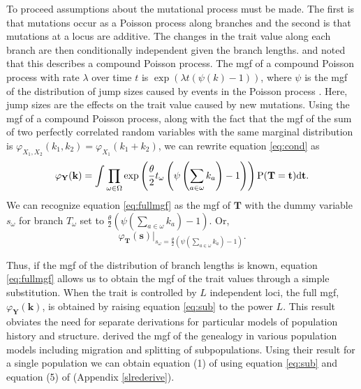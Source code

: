 To proceed assumptions about the mutational process must be made. The first is
that mutations occur as a Poisson process along branches and the second is that
mutations at a locus are additive. The changes in the trait value along each
branch are then conditionally independent given the branch
lengths. \citet{Khaitovich2005} and \citet{Schraiber2015} noted that this
describes a compound Poisson process. The mgf of a compound Poisson process with
rate $\lambda$ over time $t$ is $\exp(\lambda t (\psi(k)-1))$, where $\psi$ is
the mgf of the distribution of jump sizes caused by events in the Poisson
process \citep{kingman-poisson-processes}. Here, jump sizes are the effects on
the trait value caused by new mutations. Using the mgf of a compound Poisson
process, along with the fact that the mgf of the sum of two perfectly correlated
random variables with the same marginal distribution is
$\varphi_{X_1,X_2}(k_1,k_2)=\varphi_{X_1}(k_1+k_2)$, we can rewrite
equation \eqref{eq:cond} as
\begin{equation}
  \label{eq:fullmgf}
  \varphi_{\mathbf{Y}}(\mathbf{k}) = 
  \int \prod_{\omega \in \Omega} \exp\left( \frac{\theta}{2} t_{\omega} \left( \psi\left(\sum_{a \in \omega}k_{a}\right) -1 \right)\right)
  \mathrm{P}(\mathbf{T}=\mathbf{t})\mbox{d}\mathbf{t}.
\end{equation}
We can recognize equation \eqref{eq:fullmgf} as the mgf of $\mathbf{T}$ with the
dummy variable $s_{\omega}$ for branch $T_\omega$ set to
$\frac{\theta}{2} \left( \psi(\sum_{a \in \omega}k_{a}) -1 \right)$. Or,
\begin{equation}
  \label{eq:sub}
  \varphi_{\mathbf{T}}(\mathbf{s})\Bigr|_{s_{\omega}=\frac{\theta}{2} \left( \psi\left(\sum_{a \in \omega}k_{a}\right) -1 \right)}.
\end{equation}

Thus, if the mgf of the distribution of branch lengths is known, equation
\eqref{eq:fullmgf} allows us to obtain the mgf of the trait values through a
simple substitution. When the trait is controlled by $L$ independent loci, the
full mgf, $\varphi_{\mathbf{Y}}(\mathbf{k})$, is obtained by raising
equation \eqref{eq:sub} to the power $L$. This result obviates the need for
separate derivations for particular models of population history and structure.
\citet{Lohse2011} derived the mgf of the genealogy in various population models
including migration and splitting of subpopulations. Using their result for a
single population we can obtain equation (1) of \citet{Schraiber2015} using
equation \eqref{eq:sub} and equation (5) of \citet{Lohse2011}
(Appendix \ref{slrederive}). 

